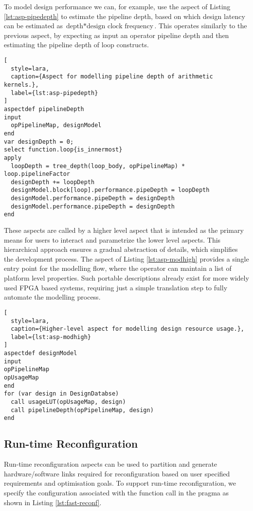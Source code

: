 To model design performance we can, for example, use the aspect of
Listing \ref{lst:asp-pipedepth} to estimate the pipeline depth, based
on which design latency can be estimated as $\text{depth} *
\text{design clock frequency}$. This operates similarly to the
previous aspect, by expecting as input an operator pipeline depth and
then estimating the pipeline depth of loop constructs.

\begin{lstlisting}[
  style=lara,
  caption={Aspect for modelling pipeline depth of arithmetic kernels.},
  label={lst:asp-pipedepth}
]
aspectdef pipelineDepth
input
  opPipelineMap, designModel
end
var designDepth = 0;
select function.loop{is_innermost}
apply
  loopDepth = tree_depth(loop_body, opPipelineMap) * loop.pipelineFactor
  designDepth += loopDepth
  designModel.block[loop].performance.pipeDepth = loopDepth
  designModel.performance.pipeDepth = designDepth
  designModel.performance.pipeDepth = designDepth
end
\end{lstlisting}

These aspects are called by a higher level aspect that is intended as
the primary means for users to interact and parametrize the lower
level aspects. This hierarchical approach ensures a gradual
abstraction of details, which simplifies the development process.  The
aspect of Listing \ref{lst:asp-modhigh} provides a single entry point
for the modelling flow, where the operator can maintain a list of
platform level properties. Such portable descriptions already exist
for more widely used FPGA based systems, requiring just a simple
translation step to fully automate the modelling process.

\begin{lstlisting}[
  style=lara,
  caption={Higher-level aspect for modelling design resource usage.},
  label={lst:asp-modhigh}
]
aspectdef designModel
input
opPipelineMap
opUsageMap
end
for (var design in DesignDatabse)
  call usageLUT(opUsageMap, design)
  call pipelineDepth(opPipelineMap, design)
end
\end{lstlisting}

\subsection{Run-time Reconfiguration}
\label{sect:asp_reconfig}


Run-time reconfiguration aspects can be used to partition and generate
hardware/software links required for reconfiguration based on user
specified requirements and optimisation goals. To support run-time
reconfiguration, we specify the configuration associated with the
function call in the \FAST{} pragma as shown in Listing
\ref{lst:fast-reconf}.

